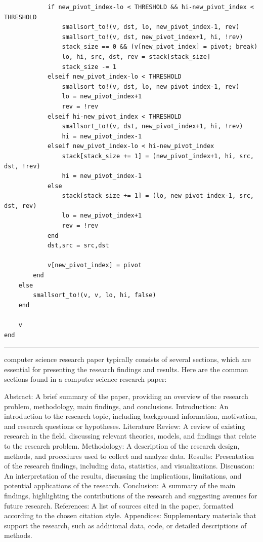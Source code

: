 \documentclass{juliacon}
\begin{document}
\begin{lstlisting}
            if new_pivot_index-lo < THRESHOLD && hi-new_pivot_index < THRESHOLD
                smallsort_to!(v, dst, lo, new_pivot_index-1, rev)
                smallsort_to!(v, dst, new_pivot_index+1, hi, !rev)
                stack_size == 0 && (v[new_pivot_index] = pivot; break)
                lo, hi, src, dst, rev = stack[stack_size]
                stack_size -= 1
            elseif new_pivot_index-lo < THRESHOLD
                smallsort_to!(v, dst, lo, new_pivot_index-1, rev)
                lo = new_pivot_index+1
                rev = !rev
            elseif hi-new_pivot_index < THRESHOLD
                smallsort_to!(v, dst, new_pivot_index+1, hi, !rev)
                hi = new_pivot_index-1
            elseif new_pivot_index-lo < hi-new_pivot_index
                stack[stack_size += 1] = (new_pivot_index+1, hi, src, dst, !rev)
                hi = new_pivot_index-1
            else
                stack[stack_size += 1] = (lo, new_pivot_index-1, src, dst, rev)
                lo = new_pivot_index+1
                rev = !rev
            end
            dst,src = src,dst

            v[new_pivot_index] = pivot
        end
    else
        smallsort_to!(v, v, lo, hi, false)
    end

    v
end
\end{lstlisting}

\hrule

 computer science research paper typically consists of several sections, which are essential for presenting the research findings and results. Here are the common sections found in a computer science research paper:

    Abstract: A brief summary of the paper, providing an overview of the research problem, methodology, main findings, and conclusions.
    Introduction: An introduction to the research topic, including background information, motivation, and research questions or hypotheses.
    Literature Review: A review of existing research in the field, discussing relevant theories, models, and findings that relate to the research problem.
    Methodology: A description of the research design, methods, and procedures used to collect and analyze data.
    Results: Presentation of the research findings, including data, statistics, and visualizations.
    Discussion: An interpretation of the results, discussing the implications, limitations, and potential applications of the research.
    Conclusion: A summary of the main findings, highlighting the contributions of the research and suggesting avenues for future research.
    References: A list of sources cited in the paper, formatted according to the chosen citation style.
    Appendices: Supplementary materials that support the research, such as additional data, code, or detailed descriptions of methods.
\end{document}
